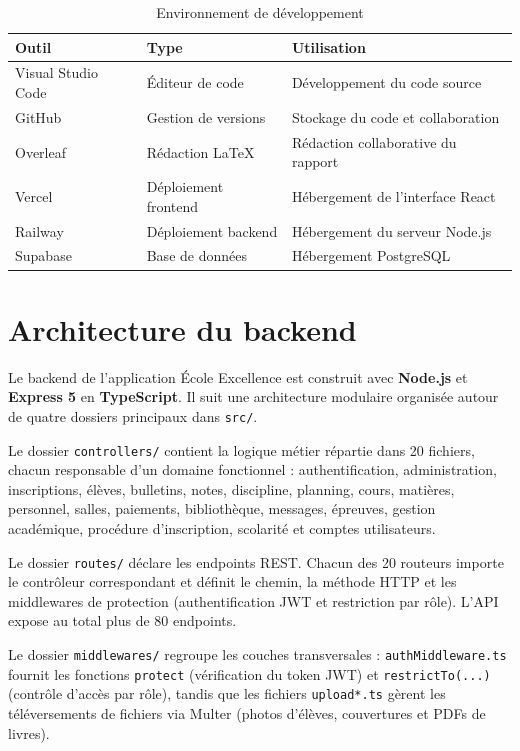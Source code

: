 \documentclass[12pt, a4paper]{report}
\begin{document}
\begin{table}[htbp]
\centering
\small
\begin{tabular}{|p{3cm}|p{3cm}|p{7cm}|}
\hline
\textbf{Outil} & \textbf{Type} & \textbf{Utilisation} \\
\hline
Visual Studio Code & Éditeur de code & Développement du code source \\
\hline
GitHub & Gestion de versions & Stockage du code et collaboration \\
\hline
Overleaf & Rédaction LaTeX & Rédaction collaborative du rapport \\
\hline
Vercel & Déploiement frontend & Hébergement de l'interface React \\
\hline
Railway & Déploiement backend & Hébergement du serveur Node.js \\
\hline
Supabase & Base de données & Hébergement PostgreSQL \\
\hline
\end{tabular}
\caption{Environnement de développement}
\label{tab:env_dev}
\end{table}

\section{Architecture du backend}

Le backend de l'application École Excellence est construit avec \textbf{Node.js} et \textbf{Express 5} en \textbf{TypeScript}. Il suit une architecture modulaire organisée autour de quatre dossiers principaux dans \texttt{src/}.

Le dossier \texttt{controllers/} contient la logique métier répartie dans 20 fichiers, chacun responsable d'un domaine fonctionnel : authentification, administration, inscriptions, élèves, bulletins, notes, discipline, planning, cours, matières, personnel, salles, paiements, bibliothèque, messages, épreuves, gestion académique, procédure d'inscription, scolarité et comptes utilisateurs.

Le dossier \texttt{routes/} déclare les endpoints REST. Chacun des 20 routeurs importe le contrôleur correspondant et définit le chemin, la méthode HTTP et les middlewares de protection (authentification JWT et restriction par rôle). L'API expose au total plus de 80 endpoints.

Le dossier \texttt{middlewares/} regroupe les couches transversales : \texttt{authMiddleware.ts} fournit les fonctions \texttt{protect} (vérification du token JWT) et \texttt{restrictTo(...)} (contrôle d'accès par rôle), tandis que les fichiers \texttt{upload*.ts} gèrent les téléversements de fichiers via Multer (photos d'élèves, couvertures et PDFs de livres).
\end{document}
